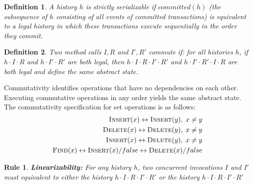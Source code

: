 \documentclass[]{sig-alternate-05-2015}
\newtheorem{definition}{Definition}
\newtheorem{crule}{Rule}
\begin{document}
\begin{definition}
    A history $h$ is strictly serializable if $committed(h)$ (the subsequence of $h$ consisting of all events of committed transactions) is equivalent to a legal history in which these transactions execute sequentially in the order they commit.
\end{definition}



\begin{definition}
    Two method calls $I,R$ and $I',R'$ commute if: for all histories $h$, if $h \cdot I \cdot R$ and $h \cdot I' \cdot R'$ are both legal, then $h \cdot I \cdot R \cdot I' \cdot R'$ and $h \cdot I' \cdot R' \cdot I \cdot R$ are both legal and define the same abstract state.
\end{definition}

Commutativity identifies operations that have no dependencies on each other.
Executing commutative operations in any order yields the same abstract state.
The commutativity specification for set operations is as follows:
\begin{equation}
    \label{eq:commute}
\begin{aligned}
    \textsc{Insert}(x) \leftrightarrow \textsc{Insert}(y),\;x \ne y \\
    \textsc{Delete}(x) \leftrightarrow \textsc{Delete}(y),\;x \ne y \\
    \textsc{Insert}(x) \leftrightarrow \textsc{Delete}(y),\;x \ne y \\
    \textsc{Find}(x) \leftrightarrow \textsc{Insert}(x)/false \leftrightarrow \textsc{Delete}(x)/false
\end{aligned}
\end{equation}

\begin{crule}
    \textbf{Linearizability:} For any history $h$, two concurrent invocations $I$ and $I'$ must equivalent to either the history $h \cdot I \cdot R \cdot I' \cdot R'$ or the history $h \cdot I \cdot R \cdot I' \cdot R'$
\end{crule}
\end{document}
